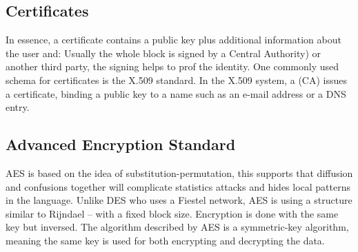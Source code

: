 \subsection{Certificates} %
In essence, a certificate contains a public key plus additional information about the user and: Usually the whole block is signed by a Central Authority) or another third party, the signing helps to prof the identity.
One commonly used schema for certificates is the X.509 standard. In the X.509 system, a (CA) issues a certificate, binding a public key to a name such as an e-mail address or a DNS entry.

\subsection{Advanced Encryption Standard}
AES is based on the idea of substitution-permutation\cite{AESISFAST:Online}, this supports that
diffusion and confusions together will complicate statistics attacks and hides local patterns in the language. Unlike DES who uses a Fiestel network, AES is using a structure  similar to Rijndael – with a fixed block size. Encryption is done with the same key but inversed. The algorithm described by AES is a symmetric-key algorithm, meaning the same key is used for both encrypting and decrypting the data.
